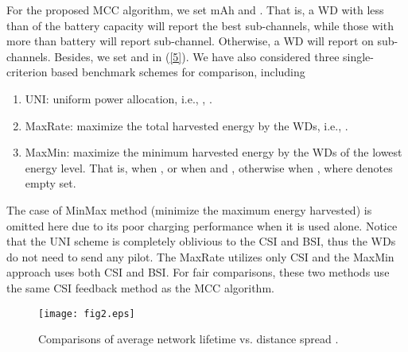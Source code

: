 \documentclass[conference]{IEEEtran}
\begin{document}
For the proposed MCC algorithm, we set  mAh and . That is, a WD with less than  of the battery capacity will report the  best sub-channels, while those with more than  battery will report  sub-channel. Otherwise, a WD will report on  sub-channels. Besides, we set  and  in (\ref{5}). We have also considered three single-criterion based benchmark schemes for comparison, including
\begin{enumerate}
  \item UNI: uniform power allocation, i.e., , .
  \item MaxRate:  maximize the total harvested energy by the WDs, i.e., .
  \item MaxMin: maximize the minimum harvested energy by the WDs of the lowest energy level. That is,  when , or  when  and , otherwise  when , where  denotes empty set.
\end{enumerate}
The case of MinMax method (minimize the maximum energy harvested) is omitted here due to its poor charging performance when it is used alone. Notice that the UNI scheme is completely oblivious to the CSI and BSI, thus the WDs do not need to send any pilot. The MaxRate utilizes only CSI and the MaxMin approach uses both CSI and BSI. For fair comparisons, these two methods use the same CSI feedback method as the MCC algorithm.

\begin{figure}
\centering
  \begin{center}
    \texttt{[image: fig2.eps]}
  \end{center}
  \caption{Comparisons of average network lifetime vs. distance spread .}
  \label{12}
\end{figure}
\end{document}
